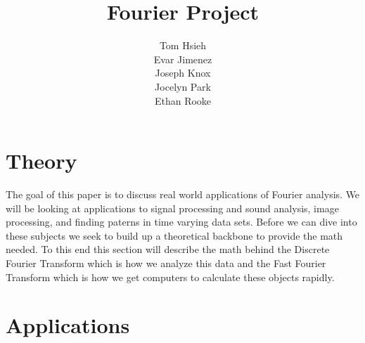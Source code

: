 \documentclass[11pt]{report}
\title{Fourier Project}
\author{Tom Hsieh\\
        Evar Jimenez\\
        Joseph Knox\\
        Jocelyn Park \\
        Ethan Rooke }
\begin{document}
\maketitle

\tableofcontents

\chapter{Theory}
  The goal of this paper is to discuss real world applications
  of Fourier analysis. We will be looking at applications to
  signal processing and sound analysis, image processing, and
  finding paterns in time varying data sets. Before we can
  dive into these subjects we seek to build up a theoretical
  backbone to provide the math needed. To this end this
  section will describe the math behind the Discrete Fourier Transform
  which is how we analyze this data and the Fast Fourier Transform
  which is how we get computers to calculate these objects rapidly.
  
  
\chapter{Applications}
  
  
  

  \nocite{*} %
  \printbibliography
\end{document}
